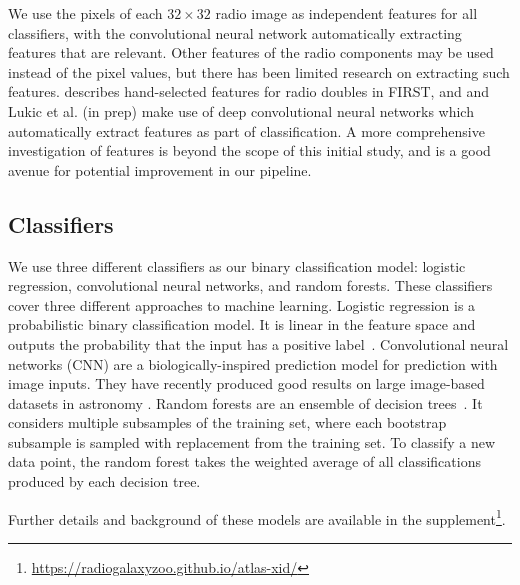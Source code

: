 \documentclass[fleqn,usenatbib,usedcolumn]{mnras}
\begin{document}
    We use the pixels of each $32 \times 32$ radio image as independent
    features for all classifiers, with the convolutional neural network
    automatically extracting
    features that are relevant. Other features of the radio components may be used instead of the pixel values, but there has been limited research on extracting
    such features. \citet{proctor06} describes hand-selected
    features for radio doubles in FIRST, and \citet{aniyan17cnn} and
    Lukic et al. (in prep) make use of deep convolutional neural networks
    which automatically extract features as part of classification. A more
    comprehensive investigation of features is beyond the scope of this initial study, and is a good
    avenue for potential improvement in our pipeline.

  \subsection{Classifiers}\label{sec:classifiers}

    We use three different classifiers as our binary classification model:
    logistic regression, convolutional neural networks, and random forests.
    These classifiers cover three different approaches to machine learning.
    Logistic regression is a probabilistic binary classification model.
    It is linear in the
    feature space and outputs the probability that the input has a positive
    label~\citep[Chap. 4]{bishop06ml}.
    Convolutional neural networks (CNN) are a biologically-inspired
    prediction model for prediction with image inputs.
    They have recently produced good results on large image-based datasets
    in astronomy \citep[e.g.][Lukic et al. in prep]{dieleman15cnn}.
    Random forests are an ensemble of decision
    trees~\citep{breiman01random-forest}. It considers multiple subsamples
    of the training set, where each bootstrap subsample is sampled with
    replacement from the training set. To classify a new data
    point, the random forest takes the weighted average of all
    classifications produced by each decision tree.

    Further details and background of these models are available in the
    supplement\footnote{\url{https://radiogalaxyzoo.github.io/atlas-xid/}}.
\end{document}
